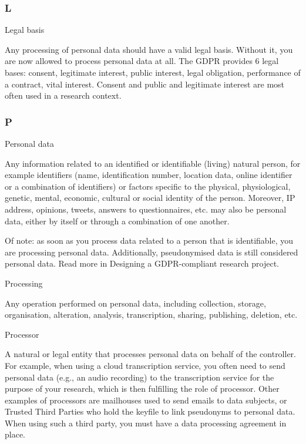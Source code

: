 \documentclass[
]{book}
\begin{document}
\hypertarget{l}{%
\subsubsection{L}\label{l}}

Legal basis

Any processing of personal data should have a valid legal basis. Without it, you are now allowed to process personal data at all.
The GDPR provides 6 legal bases: consent, legitimate interest, public interest, legal obligation, performance of a contract, vital
interest. Consent and public and legitimate interest are most often used in a research context.

\hypertarget{p}{%
\subsubsection{P}\label{p}}

Personal data

Any information related to an identified or identifiable (living) natural person, for example identifiers (name, identification number,
location data, online identifier or a combination of identifiers) or factors specific to the physical, physiological, genetic, mental,
economic, cultural or social identity of the person. Moreover, IP address, opinions, tweets, answers to questionnaires, etc. may also be
personal data, either by itself or through a combination of one another.

Of note: as soon as you process data related to a person that is identifiable, you are processing personal data. Additionally,
pseudonymised data is still considered personal data. Read more in Designing a GDPR-compliant research project.

Processing

Any operation performed on personal data, including collection, storage, organisation, alteration, analysis,
transcription, sharing, publishing, deletion, etc.

Processor

A natural or legal entity that processes personal data on behalf of the
controller. For example, when using a cloud transcription service, you often
need to send personal data (e.g., an audio recording) to the transcription
service for the purpose of your research, which is then fulfilling the role
of processor. Other examples of processors are mailhouses used to send emails
to data subjects, or Trusted Third Parties who hold the keyfile to link
pseudonyms to personal data. When using such a third party, you must have a
data processing agreement in place.
\end{document}
